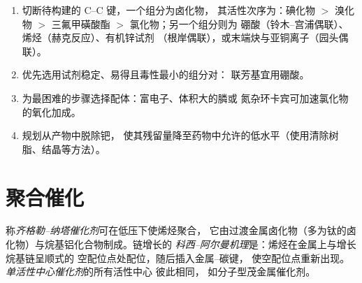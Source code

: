 \begin{method}[选择交叉偶联方法]\label{met:b3:homogeneous-catalysis:choose-coupling}
\begin{enumerate}
  \item 切断待构建的 C--C 键，一个组分为卤化物，
        其活性次序为：碘化物 $>$ 溴化物 $>$ 三氟甲磺酸酯 $>$ 氯化物；另一个组分则为
        硼酸（铃木–宫浦偶联）、烯烃（赫克反应）、有机锌试剂
        （根岸偶联），或末端炔与亚铜离子（园头偶联）。
  \item 优先选用试剂稳定、易得且毒性最小的组分对：
        联芳基宜用硼酸。
  \item 为最困难的步骤选择配体：富电子、体积大的膦或
        氮杂环卡宾可加速氯化物的氧化加成。
  \item 规划从产物中脱除钯，
        使其残留量降至药物中允许的低水平（使用清除树脂、结晶等方法）。
\end{enumerate}
\end{method}

\section{聚合催化}

\begin{definition}\label{def:b3:homogeneous-catalysis:ziegler-natta}
称\emph{齐格勒–纳塔催化剂}可在低压下使烯烃聚合，
它由过渡金属卤化物（多为钛的卤化物）与烷基铝化合物制成。链增长的
\emph{科西–阿尔曼机理}是：烯烃在金属上与增长烷基链呈顺式的
空配位点处配位，随后插入金属–碳键，
使空配位点重新出现。
\emph{单活性中心催化剂}的所有活性中心
彼此相同，
如分子型茂金属催化剂。
\end{definition}

